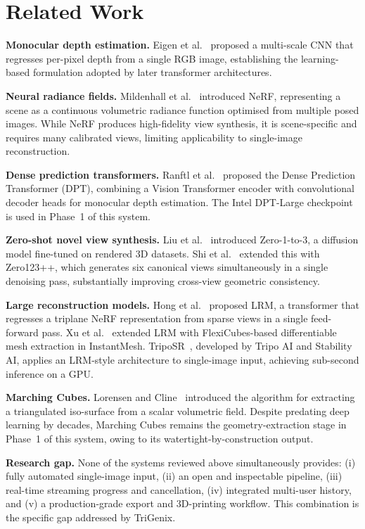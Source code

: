 ﻿\documentclass[conference]{IEEEtran}
\begin{document}
\section{Related Work}

\textbf{Monocular depth estimation.}
Eigen et al.~\cite{eigen} proposed a multi-scale CNN that regresses per-pixel depth from a single RGB image,
establishing the learning-based formulation adopted by later transformer architectures.

\textbf{Neural radiance fields.}
Mildenhall et al.~\cite{nerf} introduced NeRF, representing a scene as a continuous volumetric radiance function
optimised from multiple posed images. While NeRF produces high-fidelity view synthesis, it is scene-specific and
requires many calibrated views, limiting applicability to single-image reconstruction.

\textbf{Dense prediction transformers.}
Ranftl et al.~\cite{dpt} proposed the Dense Prediction Transformer (DPT), combining a Vision Transformer encoder
with convolutional decoder heads for monocular depth estimation. The Intel DPT-Large checkpoint is used in
Phase~1 of this system.

\textbf{Zero-shot novel view synthesis.}
Liu et al.~\cite{zero1to3} introduced Zero-1-to-3, a diffusion model fine-tuned on rendered 3D datasets.
Shi et al.~\cite{zero123pp} extended this with Zero123++, which generates six canonical views simultaneously
in a single denoising pass, substantially improving cross-view geometric consistency.

\textbf{Large reconstruction models.}
Hong et al.~\cite{lrm} proposed LRM, a transformer that regresses a triplane NeRF representation from sparse
views in a single feed-forward pass. Xu et al.~\cite{instantmesh} extended LRM with FlexiCubes-based
differentiable mesh extraction in InstantMesh. TripoSR~\cite{triposr}, developed by Tripo AI and Stability AI,
applies an LRM-style architecture to single-image input, achieving sub-second inference on a GPU.

\textbf{Marching Cubes.}
Lorensen and Cline~\cite{marching_cubes} introduced the algorithm for extracting a triangulated iso-surface from
a scalar volumetric field. Despite predating deep learning by decades, Marching Cubes remains the geometry-extraction
stage in Phase~1 of this system, owing to its watertight-by-construction output.

\textbf{Research gap.}
None of the systems reviewed above simultaneously provides: (i) fully automated single-image input, (ii) an
open and inspectable pipeline, (iii) real-time streaming progress and cancellation, (iv) integrated multi-user
history, and (v) a production-grade export and 3D-printing workflow. This combination is the specific gap
addressed by TriGenix.
\end{document}
